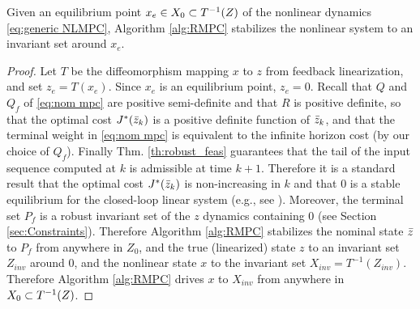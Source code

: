 
\begin{theorem}[Stability]
	\label{thm:stability}
Given an equilibrium point $x_e \in X_0 \subset T^{-1}(Z)$ of the nonlinear dynamics \eqref{eq:generic NLMPC}, Algorithm \ref{alg:RMPC} stabilizes the nonlinear system to an invariant set around $x_e$.
\end{theorem}

\begin{proof}
Let $T$ be the diffeomorphism mapping $x$ to $z$ from feedback linearization, and set $z_e = T(x_e)$. 
Since $x_e$ is an equilibrium point, $z_e=0$.
Recall that $Q$ and $Q_f$ of  \eqref{eq:nom mpc} are positive semi-definite and that $R$ is positive definite,  so that the optimal cost $J^*(\bar{z}_{k})$ is a positive definite function of $\bar{z}_{k}$, and that the terminal weight in \eqref{eq:nom mpc} is equivalent to the infinite horizon cost (by our choice of $Q_f$). 
Finally Thm.  \ref{th:robust_feas} guarantees that the tail of the input sequence computed at $k$ is admissible at time $k+1$. 
Therefore it is a standard result that the optimal cost $J^{*}({\bar{z}}_{k})$ is non-increasing in $k$ and that $0$ is a stable equilibrium for the closed-loop linear system (e.g., see \cite{CannonK15MPC} ). 
Moreover, the terminal set $P_f$ is a robust invariant set of the $z$ dynamics containing 0 (see Section \ref{sec:Constraints}).
Therefore Algorithm \ref{alg:RMPC} stabilizes the nominal state $\bar{z}$ to $P_f$ from anywhere in $Z_0$, and the true (linearized) state $z$ to an invariant set $Z_{inv}$ around $0$, and the nonlinear state $x$ to the invariant set $X_{inv} = T^{-1}(Z_{inv})$.
Therefore Algorithm \ref{alg:RMPC} drives $x$ to $X_{inv}$ from anywhere in $X_0 \subset T^{-1}(Z)$.
\end{proof}